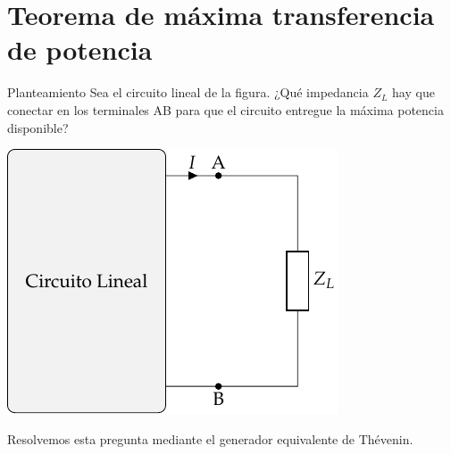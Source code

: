 \documentclass[aspectratio=169, usenames,svgnames,dvipsnames]{beamer}
\begin{document}
\section{Teorema de máxima transferencia de potencia}
\label{sec:org9ab4cea}

\begin{frame}[label={sec:orgd815c4c}]{Planteamiento}
Sea el circuito lineal de la figura. ¿Qué impedancia \(Z_L\) hay que conectar en los terminales AB para que el circuito entregue la máxima potencia disponible?

\begin{center}
\includegraphics[height=0.55\textheight]{../figs/CircuitoLineal_ZL.pdf}
\end{center}

Resolvemos esta pregunta mediante el generador equivalente de Thévenin.
\end{frame}
\end{document}
